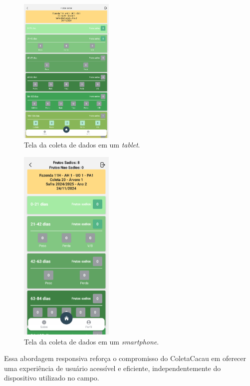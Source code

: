 \begin{figure}[H]
    \centering
    \includegraphics[width=0.4\textwidth]{images/app/collect-screen-tablet.png}
    \caption{Tela da coleta de dados em um \textit{tablet}.}
    \label{fig:CollectScreenTablet}
\end{figure}
\newpage
\begin{figure}[H]
    \centering
    \includegraphics[width=0.4\textwidth]{images/app/collect-screen-phone.png}
    \caption{Tela da coleta de dados em um \textit{smartphone}.}
    \label{fig:CollectScreenPhone}
\end{figure}

Essa abordagem responsiva reforça o compromisso do ColetaCacau em oferecer uma experiência de usuário acessível e eficiente, independentemente do dispositivo utilizado no campo.


